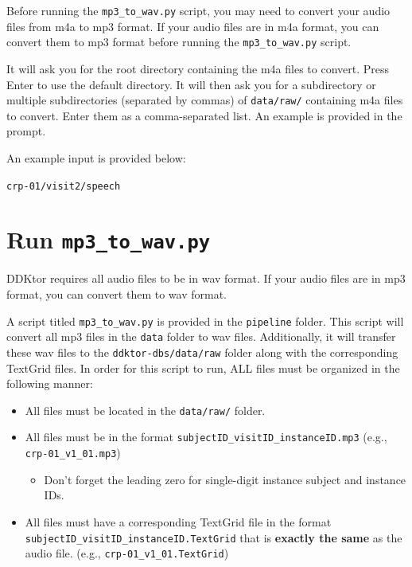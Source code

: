 \documentclass[
]{book}
\providecommand{\tightlist}{%
  \setlength{\itemsep}{0pt}\setlength{\parskip}{0pt}}
\begin{document}
Before running the \texttt{mp3\_to\_wav.py} script, you may need to convert your audio files from m4a to mp3 format. If your audio files are in m4a format, you can convert them to mp3 format before running the \texttt{mp3\_to\_wav.py} script.

It will ask you for the root directory containing the m4a files to convert. Press Enter to use the default directory. It will then ask you for a subdirectory or multiple subdirectories (separated by commas) of \texttt{data/raw/} containing m4a files to convert. Enter them as a comma-separated list. An example is provided in the prompt.

An example input is provided below:

\texttt{crp-01/visit2/speech}

\section{\texorpdfstring{Run \texttt{mp3\_to\_wav.py}}{Run mp3\_to\_wav.py}}\label{run-mp3_to_wav.py}

DDKtor requires all audio files to be in wav format. If your audio files are in mp3 format, you can convert them to wav format.

A script titled \texttt{mp3\_to\_wav.py} is provided in the \texttt{pipeline} folder. This script will convert all mp3 files in the \texttt{data} folder to wav files. Additionally, it will transfer these wav files to the \texttt{ddktor-dbs/data/raw} folder along with the corresponding TextGrid files. In order for this script to run, ALL files must be organized in the following manner:

\begin{itemize}
\tightlist
\item
  All files must be located in the \texttt{data/raw/} folder.\\
\item
  All files must be in the format \texttt{subjectID\_visitID\_instanceID.mp3} (e.g., \texttt{crp-01\_v1\_01.mp3})

  \begin{itemize}
  \tightlist
  \item
    Don't forget the leading zero for single-digit instance subject and instance IDs.
  \end{itemize}
\item
  All files must have a corresponding TextGrid file in the format \texttt{subjectID\_visitID\_instanceID.TextGrid} that is \textbf{exactly the same} as the audio file. (e.g., \texttt{crp-01\_v1\_01.TextGrid})
\end{itemize}
\end{document}
